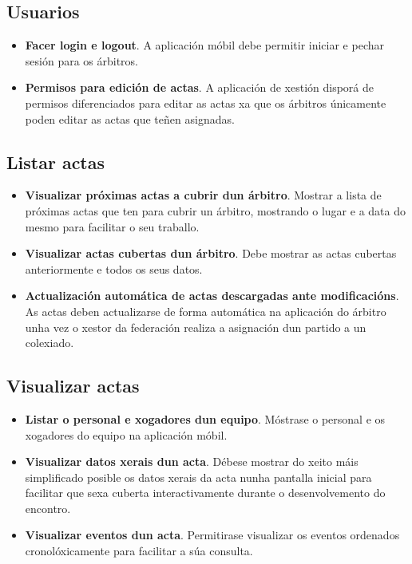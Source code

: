   \subsection{Usuarios}

    \begin{itemize}

    \item \textbf{Facer login e logout}.
    A aplicación móbil debe permitir iniciar e pechar sesión para os árbitros.

    \item \textbf{Permisos para edición de actas}.
    A aplicación de xestión disporá de permisos diferenciados para editar as 
actas xa que os árbitros únicamente poden editar as actas que teñen asignadas.

    \end{itemize}

  \subsection{Listar actas}

    \begin{itemize}

    \item \textbf{Visualizar próximas actas a cubrir dun árbitro}.
    Mostrar a lista de próximas actas que ten para cubrir un árbitro, mostrando 
o lugar e a data do mesmo para facilitar o seu traballo.

    \item \textbf{Visualizar actas cubertas dun árbitro}.
    Debe mostrar as actas cubertas anteriormente e todos os seus datos.

    \item \textbf{Actualización automática de actas descargadas ante 
modificacións}.
    As actas deben actualizarse de forma automática na aplicación do árbitro 
unha vez o xestor da federación realiza a asignación dun partido a un colexiado.

    \end{itemize}

  \subsection{Visualizar actas}

    \begin{itemize}

    \item \textbf{Listar o personal e xogadores dun equipo}.
    Móstrase o personal e os xogadores do equipo na aplicación móbil.

    \item \textbf{Visualizar datos xerais dun acta}.
    Débese mostrar do xeito máis simplificado posible os datos xerais da acta 
nunha pantalla inicial para facilitar que sexa cuberta interactivamente durante 
o desenvolvemento do encontro.

    \item \textbf{Visualizar eventos dun acta}.
    Permitirase visualizar os eventos ordenados cronolóxicamente para facilitar 
a súa consulta.

    \end{itemize}

